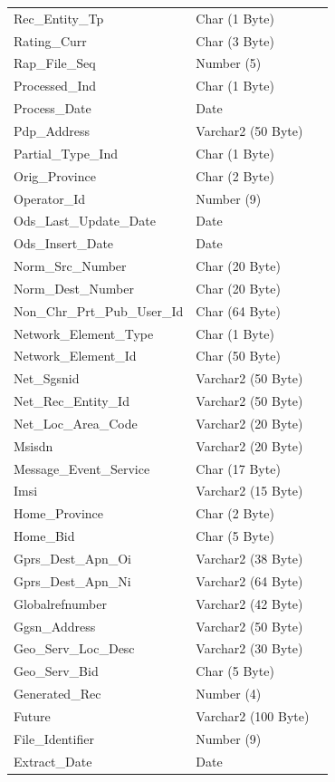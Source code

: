 \documentclass[12pt,twoside]{article}
\begin{document}
\begin{longtable}{l|l|l}
Rec\_Entity\_Tp & Char (1 Byte) & \\
Rating\_Curr & Char (3 Byte) & \\
Rap\_File\_Seq & Number (5) & \\
Processed\_Ind & Char (1 Byte) & \\
Process\_Date & Date & \\
Pdp\_Address & Varchar2 (50 Byte) & \\
Partial\_Type\_Ind & Char (1 Byte) & \\
Orig\_Province & Char (2 Byte) & \\
Operator\_Id & Number (9) & \\
Ods\_Last\_Update\_Date & Date & \\
Ods\_Insert\_Date & Date & \\
Norm\_Src\_Number & Char (20 Byte) & \\
Norm\_Dest\_Number & Char (20 Byte) & \\
Non\_Chr\_Prt\_Pub\_User\_Id & Char (64 Byte) & \\
Network\_Element\_Type & Char (1 Byte) & \\
Network\_Element\_Id & Char (50 Byte) & \\
Net\_Sgsnid & Varchar2 (50 Byte) & \\
Net\_Rec\_Entity\_Id & Varchar2 (50 Byte) & \\
Net\_Loc\_Area\_Code & Varchar2 (20 Byte) & \\
Msisdn & Varchar2 (20 Byte) & \\
Message\_Event\_Service & Char (17 Byte) & \\
Imsi & Varchar2 (15 Byte) & \\
Home\_Province & Char (2 Byte) & \\
Home\_Bid & Char (5 Byte) & \\
Gprs\_Dest\_Apn\_Oi & Varchar2 (38 Byte) & \\
Gprs\_Dest\_Apn\_Ni & Varchar2 (64 Byte) & \\
Globalrefnumber & Varchar2 (42 Byte) & \\
Ggsn\_Address & Varchar2 (50 Byte) & \\
Geo\_Serv\_Loc\_Desc & Varchar2 (30 Byte) & \\
Geo\_Serv\_Bid & Char (5 Byte) & \\
Generated\_Rec & Number (4) & \\
Future & Varchar2 (100 Byte) & \\
File\_Identifier & Number (9) & \\
Extract\_Date & Date & \\

\end{longtable}
\end{document}
